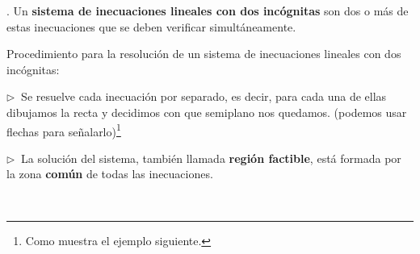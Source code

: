 \vspace{5mm}

\begin{theorem}
.	Un \textbf{sistema de inecuaciones lineales con dos incógnitas}	 son dos o más de estas inecuaciones que se deben verificar simultáneamente.

\vspace{5mm}
\begin{destacado}

Procedimiento para la resolución de un sistema de inecuaciones lineales con dos incógnitas:

\vspace{4mm} $\triangleright\ $ Se resuelve cada inecuación por separado, es decir, para cada una de ellas dibujamos la recta y decidimos con que semiplano nos quedamos. (podemos usar flechas para señalarlo)\footnote{Como muestra el ejemplo siguiente.}

\vspace{4mm} $\triangleright\ $ La solución del sistema, también llamada \textbf{región factible}, está formada por la zona \textbf{común} de todas las inecuaciones.

$\ $	
\end{destacado}
\end{theorem}

